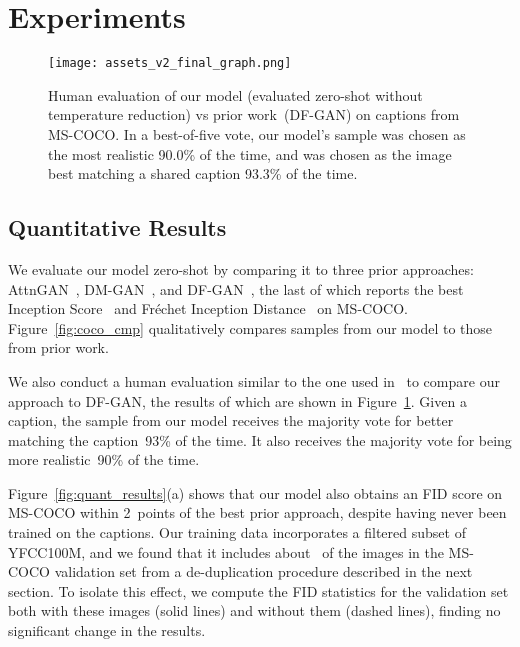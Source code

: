 \documentclass{article}
\begin{document}
\section{Experiments}
\label{sec:experiments}
\begin{figure}[t]
    \centering
    \texttt{[image: assets\_v2\_final\_graph.png]}
    \caption{Human evaluation of our model (evaluated zero-shot without temperature reduction) vs prior work~(DF-GAN) on captions from MS-COCO. In a best-of-five vote, our model's sample was chosen as the most realistic 90.0\% of the time, and was chosen as the image best matching a shared caption 93.3\% of the time.}
    \label{fig:human_eval}
\end{figure}


\subsection{Quantitative Results}

We evaluate our model zero-shot by comparing it to three prior approaches: AttnGAN~\cite{xu2018attngan}, DM-GAN~\cite{zhu2019dm}, and DF-GAN~\cite{tao2020df}, the last of which reports the best Inception Score~\cite{salimans2016improved} and Fr\'echet Inception Distance~\cite{heusel2017gans} on MS-COCO. Figure~\ref{fig:coco_cmp} qualitatively compares samples from our model to those from prior work.

We also conduct a human evaluation similar to the one used in~\citet{koh2021text} to compare our approach to DF-GAN, the results of which are shown in Figure~\ref{fig:human_eval}. Given a caption, the sample from our model receives the majority vote for better matching the caption~93\% of the time. It also receives the majority vote for being more realistic~90\% of the time.

Figure~\ref{fig:quant_results}(a) shows that our model also obtains an FID score on MS-COCO within 2~points of the best prior approach, despite having never been trained on the captions. Our training data incorporates a filtered subset of YFCC100M, and we found that it includes about~ of the images in the MS-COCO validation set from a de-duplication procedure described in the next section. To isolate this effect, we compute the FID statistics for the validation set both with these images (solid lines) and without them (dashed lines), finding no significant change in the results.
\end{document}
